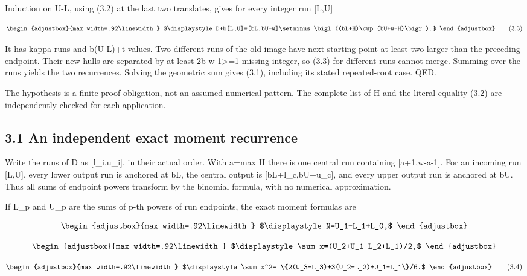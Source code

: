 Induction on U-L, using (3.2) at the last two translates, gives for every integer run {[}L,U{]}

\[
\begin{adjustbox}{max width=.92\linewidth}
$\displaystyle D+b[L,U]=[bL,bU+w]\setminus
 \bigl((bL+H)\cup(bU+w-H)\bigr).$
\end{adjustbox}
\tag{3.3}
\]

It has kappa runs and b(U-L)+t values. Two different runs of the old image have next starting point at least two larger than the preceding endpoint. Their new hulls are separated by at least 2b-w-1\textgreater=1 missing integer, so (3.3) for different runs cannot merge. Summing over the runs yields the two recurrences. Solving the geometric sum gives (3.1), including its stated repeated-root case. QED.

The hypothesis is a finite proof obligation, not an assumed numerical pattern. The complete list of H and the literal equality (3.2) are independently checked for each application.

\subsection{3.1 An independent exact moment recurrence}\label{n20-an-independent-exact-moment-recurrence}

Write the runs of D as {[}l\_i,u\_i{]}, in their actual order. With a=max H there is one central run containing {[}a+1,w-a-1{]}. For an incoming run {[}L,U{]}, every lower output run is anchored at bL, the central output is {[}bL+l\_c,bU+u\_c{]}, and every upper output run is anchored at bU. Thus all sums of endpoint powers transform by the binomial formula, with no numerical approximation.

If L\_p and U\_p are the sums of p-th powers of run endpoints, the exact moment formulas are

\[
\begin{adjustbox}{max width=.92\linewidth}
$\displaystyle N=U_1-L_1+L_0,$
\end{adjustbox}
\]

\[
\begin{adjustbox}{max width=.92\linewidth}
$\displaystyle \sum x=(U_2+U_1-L_2+L_1)/2,$
\end{adjustbox}
\]

\[
\begin{adjustbox}{max width=.92\linewidth}
$\displaystyle \sum x^2=
 \{2(U_3-L_3)+3(U_2+L_2)+U_1-L_1\}/6.$
\end{adjustbox}
\tag{3.4}
\]

